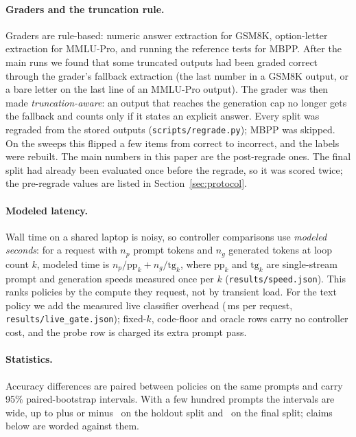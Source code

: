 \documentclass[11pt]{article}
\begin{document}
\paragraph{Graders and the truncation rule.}
Graders are rule-based: numeric answer extraction for GSM8K, option-letter extraction for MMLU-Pro, and running the reference tests for MBPP. After the main runs we found that some truncated outputs had been graded correct through the grader's fallback extraction (the last number in a GSM8K output, or a bare letter on the last line of an MMLU-Pro output). The grader was then made \emph{truncation-aware}: an output that reaches the generation cap no longer gets the fallback and counts only if it states an explicit answer. Every split was regraded from the stored outputs (\texttt{scripts/regrade.py}); MBPP was skipped. On the sweeps this flipped a few items from correct to incorrect, and the labels were rebuilt. The main numbers in this paper are the post-regrade ones. The final split had already been evaluated once before the regrade, so it was scored twice; the pre-regrade values are listed in Section~\ref{sec:protocol}.

\paragraph{Modeled latency.}
Wall time on a shared laptop is noisy, so controller comparisons use \emph{modeled seconds}: for a request with $n_p$ prompt tokens and $n_g$ generated tokens at loop count $k$, modeled time is $n_p/\mathrm{pp}_k+n_g/\mathrm{tg}_k$, where $\mathrm{pp}_k$ and $\mathrm{tg}_k$ are single-stream prompt and generation speeds measured once per $k$ (\texttt{results/speed.json}). This ranks policies by the compute they request, not by transient load. For the text policy we add the measured live classifier overhead (\TextOverheadMs\,ms per request, \texttt{results/live\_gate.json}); fixed-$k$, code-floor and oracle rows carry no controller cost, and the probe row is charged its extra prompt pass.

\paragraph{Statistics.}
Accuracy differences are paired between policies on the same prompts and carry 95\% paired-bootstrap intervals. With a few hundred prompts the intervals are wide, up to plus or minus \HoldoutCiHalf\ on the holdout split and \FinalCiHalf\ on the final split; claims below are worded against them.
\end{document}
